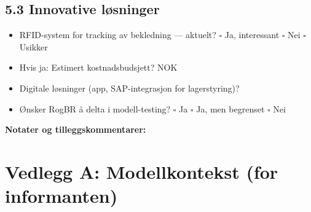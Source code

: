 \documentclass[12pt, a4paper, norsk]{article}
\begin{document}
\subsection*{5.3 Innovative løsninger}

\vspace{0.3cm}

\begin{itemize}
\item[\textbf{Q:}] RFID-system for tracking av bekledning — aktuelt?
  \newline $\square$ Ja, interessant \quad $\square$ Nei \quad $\square$ Usikker

\item[\textbf{Q:}] Hvis ja: Estimert kostnadsbudsjett?
  \newline\underline{\hspace{6cm}} NOK

\item[\textbf{Q:}] Digitale løsninger (app, SAP-integrasjon for lagerstyring)?
  \newline\underline{\hspace{12cm}}

\item[\textbf{Q:}] Ønsker RogBR å delta i modell-testing?
  \newline $\square$ Ja \quad $\square$ Ja, men begrenset \quad $\square$ Nei
\end{itemize}

\vspace{1cm}

\noindent
\hrulefill

\vspace{0.5cm}

\noindent
\textbf{Notater og tilleggskommentarer:}

\vspace{3cm}

\underline{\hspace{16cm}}

\vspace{3cm}

\underline{\hspace{16cm}}

\vspace{3cm}

\underline{\hspace{16cm}}

\newpage

\appendix

\section*{Vedlegg A: Modellkontekst (for informanten)}
\end{document}
